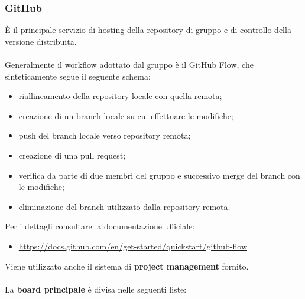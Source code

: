 \subsubsection{GitHub}
È il principale servizio di hosting della repository di gruppo e di controllo della versione distribuita. 
\\\\
Generalmente il workflow adottato dal gruppo è il GitHub Flow, che sinteticamente segue il seguente schema:
\begin{itemize}
  \item riallineamento della repository locale con quella remota;
  \item creazione di un branch locale su cui effettuare le modifiche;
  \item push del branch locale verso repository remota;
  \item creazione di una pull request;
  \item verifica da parte di due membri del gruppo e successivo merge del branch con le modifiche;
  \item eliminazione del branch utilizzato dalla repository remota.
\end{itemize}
Per i dettagli consultare la documentazione ufficiale: 
\begin{itemize}
  \item \underline{https://docs.github.com/en/get-started/quickstart/github-flow}
\end{itemize}
\medskip
Viene utilizzato anche il sistema di \textbf{project management} fornito.\\\\
La \textbf{board principale} è divisa nelle seguenti liste:
